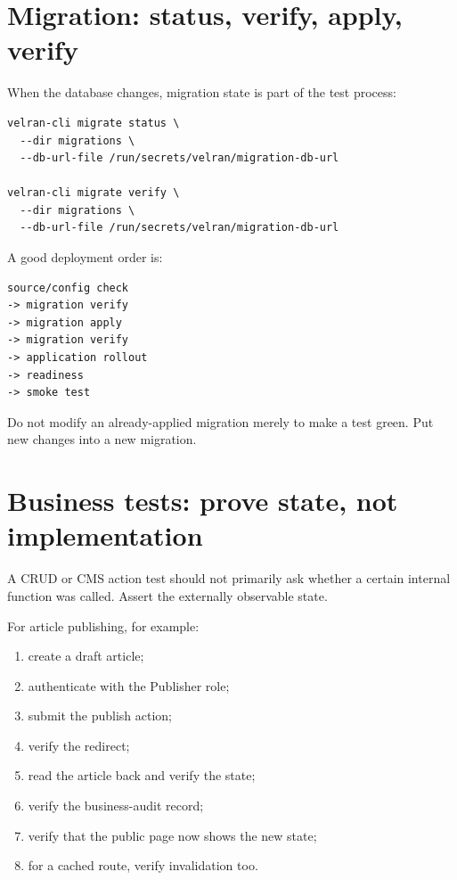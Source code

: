 \section{Migration: status, verify, apply, verify}

When the database changes, migration state is part of the test process:

\begin{lstlisting}
velran-cli migrate status \
  --dir migrations \
  --db-url-file /run/secrets/velran/migration-db-url

velran-cli migrate verify \
  --dir migrations \
  --db-url-file /run/secrets/velran/migration-db-url
\end{lstlisting}

A good deployment order is:

\begin{lstlisting}
source/config check
-> migration verify
-> migration apply
-> migration verify
-> application rollout
-> readiness
-> smoke test
\end{lstlisting}

Do not modify an already-applied migration merely to make a test green. Put new changes into a new migration.

\section{Business tests: prove state, not implementation}

A CRUD or CMS action test should not primarily ask whether a certain internal function was called. Assert the externally observable state.

For article publishing, for example:

\begin{enumerate}
  \item create a draft article;
  \item authenticate with the Publisher role;
  \item submit the publish action;
  \item verify the redirect;
  \item read the article back and verify the  state;
  \item verify the business-audit record;
  \item verify that the public page now shows the new state;
  \item for a cached route, verify invalidation too.
\end{enumerate}

